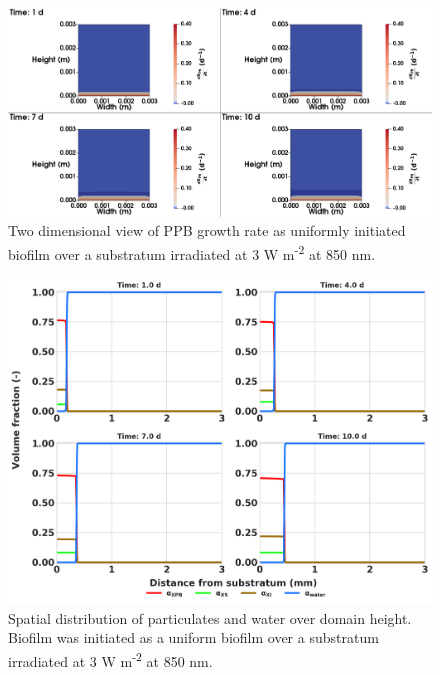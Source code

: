\begin{figure}[H]
    \centering
     \hspace*{-1cm}\includegraphics[width=1.1\textwidth,height=0.4\textheight]{Chap4/methods/data/figures/case3_growth_frac.png}
    \caption{Two dimensional view of PPB growth rate as uniformly initiated biofilm over a substratum irradiated at 3 W m\textsuperscript{-2} at 850 nm.} 
    \label{fig:case3_growth_frac}
\end{figure}

\begin{figure}[H]
    \centering
    \includegraphics[width=\textwidth,height=0.45\textheight]{Chap4/methods/output/case3.png}
    \caption{Spatial distribution of particulates and water over domain height. Biofilm was initiated as a uniform biofilm over a substratum irradiated at 3 W m\textsuperscript{-2} at 850 nm.} 
    \label{fig:case3_dist_frac}
\end{figure}








